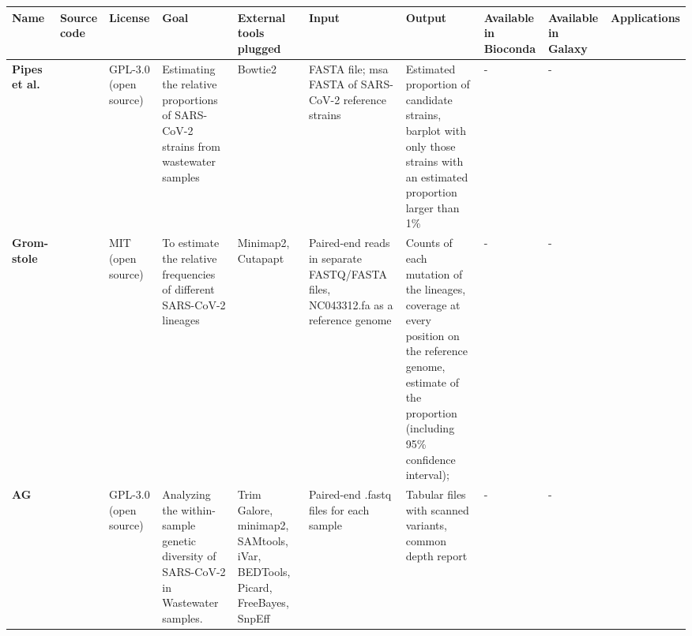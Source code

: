 \begin{landscape}
\begin{table}[ht!]
                \tiny
                \begin{tabular}{l|l|l|l|l|l|l|l|l|l}
\multicolumn{1}{m{1cm}|}{\textbf{Name}}&\multicolumn{1}{m{1cm}|}{\textbf{Source code}}&\multicolumn{1}{m{1cm}|}{\textbf{License}}&\multicolumn{1}{m{3cm}|}{\textbf{Goal}}&\multicolumn{1}{m{3cm}|}{\textbf{External tools plugged}}&\multicolumn{1}{m{3cm}|}{\textbf{Input}}&\multicolumn{1}{m{3cm}|}{\textbf{Output}}&\multicolumn{1}{m{1cm}|}{\textbf{Available in Bioconda}}&\multicolumn{1}{m{1cm}|}{\textbf{Available in Galaxy}}&\multicolumn{1}{m{1cm}}{\textbf{Applications}}\\ \hline 
\multicolumn{1}{m{1cm}|}{\textbf{Pipes et al.}}&\multicolumn{1}{m{1cm}|}{\cite{pipes2022}}&\multicolumn{1}{m{1cm}|}{GPL-3.0 (open source)}&\multicolumn{1}{m{3cm}|}{Estimating the relative proportions of SARS-CoV-2 strains from wastewater samples}&\multicolumn{1}{m{3cm}|}{Bowtie2}&\multicolumn{1}{m{3cm}|}{FASTA file; \acrshort{msa} FASTA of SARS-CoV-2 reference strains}&\multicolumn{1}{m{3cm}|}{Estimated proportion of candidate strains, barplot with only those strains with an estimated proportion larger than 1\%}&\multicolumn{1}{m{1cm}|}{-}&\multicolumn{1}{m{1cm}|}{-}&\multicolumn{1}{m{1cm}}{\cite{pipes2022}}\\ \hline 
\multicolumn{1}{m{1cm}|}{\textbf{Grom- stole}}&\multicolumn{1}{m{1cm}|}{\cite{gromstole2022}}&\multicolumn{1}{m{1cm}|}{MIT (open source)}&\multicolumn{1}{m{3cm}|}{To estimate the relative frequencies of different SARS-CoV-2 lineages}&\multicolumn{1}{m{3cm}|}{Minimap2, Cutapapt}&\multicolumn{1}{m{3cm}|}{Paired-end reads in separate FASTQ/FASTA files, NC043312.fa as a reference genome}&\multicolumn{1}{m{3cm}|}{Counts of each mutation of the lineages, coverage at every position on the reference genome, estimate of the proportion (including 95\% confidence interval); }&\multicolumn{1}{m{1cm}|}{-}&\multicolumn{1}{m{1cm}|}{-}&\multicolumn{1}{m{1cm}}{\cite{gromstole2022}}\\ \hline 
\multicolumn{1}{m{1cm}|}{\textbf{AG}}&\multicolumn{1}{m{1cm}|}{\cite{nguessan2022}}&\multicolumn{1}{m{1cm}|}{GPL-3.0 (open source)}&\multicolumn{1}{m{3cm}|}{Analyzing the within-sample genetic diversity of SARS-CoV-2 in Wastewater samples.}&\multicolumn{1}{m{3cm}|}{Trim Galore, minimap2, SAMtools, iVar, BEDTools, Picard, FreeBayes, SnpEff}&\multicolumn{1}{m{3cm}|}{Paired-end .fastq files for each sample}&\multicolumn{1}{m{3cm}|}{Tabular files with scanned variants, common depth report}&\multicolumn{1}{m{1cm}|}{-}&\multicolumn{1}{m{1cm}|}{-}&\multicolumn{1}{m{1cm}}{\cite{nguessan2022}}\\ \hline 

\end{tabular}
\end{table}
\end{landscape}
